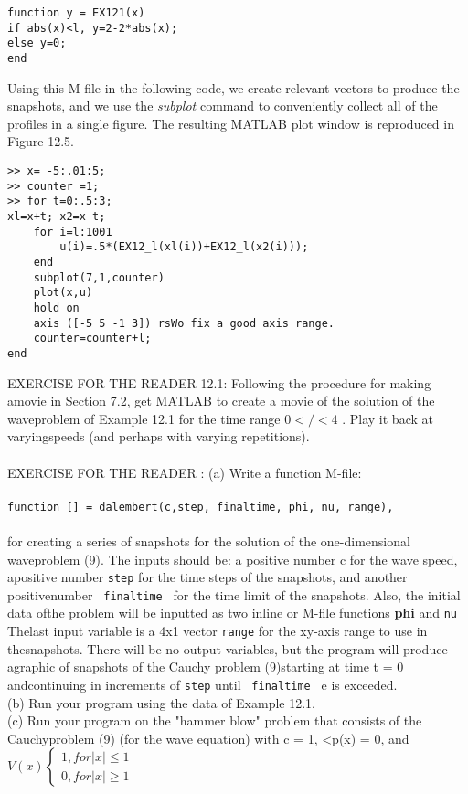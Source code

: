 \documentclass[../main.tex]{subfiles}
\begin{document}
\begin{lstlisting}[numbers=none,frame=none]
function y = EX121(x)
if abs(x)<l, y=2-2*abs(x);
else y=0;
end
\end{lstlisting}
Using this M-file in the following code, we create relevant vectors to produce the
snapshots, and we use the \textit{subplot} command to conveniently collect all of the
profiles in a single figure. The resulting MATLAB plot window is reproduced in
Figure 12.5. 
\begin{lstlisting}[numbers=none,frame=none]
>> x= -5:.01:5; 
>> counter =1; 
>> for t=0:.5:3; 
xl=x+t; x2=x-t; 
	for i=l:1001 
		u(i)=.5*(EX12_l(xl(i))+EX12_l(x2(i))); 
	end 
	subplot(7,1,counter) 
	plot(x,u) 
	hold on 
	axis ([-5 5 -1 3]) rsWo fix a good axis range. 
	counter=counter+l; 
end  
\end{lstlisting}
EXERCISE FOR THE READER 12.1: Following the procedure for making amovie in Section 7.2, get MATLAB to create a movie of the solution of the waveproblem of Example 12.1 for the time range 
$0</<4$ . Play it back at varyingspeeds (and perhaps with varying repetitions).
\\
\\
EXERCISE FOR THE READER : (a) Write a function M-file:
\\
\\
\texttt{function [] = dalembert(c,step, finaltime, phi, nu, range), }
\\
\\
for creating a series of snapshots for the solution of the one-dimensional waveproblem (9). The inputs should be: a positive number c for the wave speed, apositive number \texttt{step}  for the time steps of the snapshots, and another positivenumber \texttt{ finaltime } for the time limit of the snapshots. Also, the initial data ofthe problem will be inputted as two inline or M-file functions \textbf{phi} and \texttt{nu} Thelast input variable is a 4x1 vector \texttt{range} for the xy-axis range to use in thesnapshots. There will be no output variables, but the program will produce agraphic of snapshots of the Cauchy problem (9)starting at time t = 0 andcontinuing in increments of \texttt{step} until \texttt{ finaltime } e is exceeded.\\(b) Run your program using the data of Example 12.1.\\(c) Run your program on the "hammer blow" problem that consists of the Cauchyproblem (9) (for the wave equation) with c = 1, <p(x) = 0, and
$V(x)
\begin{cases} 
1, for \vert x \vert \leqslant 1\\
0, for  \vert x\vert\geqslant 1
\end{cases}$
\end{document}
